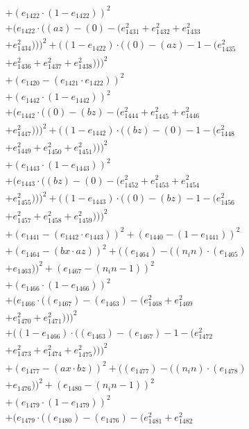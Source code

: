 \documentclass[10pt, a4paper]{article}
\begin{document}
\begin{align*}
& + (e_{1422}  \cdot  (1 - e_{1422}))^{2} \\
& + (e_{1422}  \cdot  ((az) - (0) - (e_{1431}^{2} + e_{1432}^{2} + e_{1433}^{2} \\
& + e_{1434}^{2})))^{2} + ((1 - e_{1422})  \cdot  ((0) - (az) - 1 - (e_{1435}^{2} \\
& + e_{1436}^{2} + e_{1437}^{2} + e_{1438}^{2})))^{2} \\
& + (e_{1420} - (e_{1421}  \cdot  e_{1422}))^{2} \\
& + (e_{1442}  \cdot  (1 - e_{1442}))^{2} \\
& + (e_{1442}  \cdot  ((0) - (bz) - (e_{1444}^{2} + e_{1445}^{2} + e_{1446}^{2} \\
& + e_{1447}^{2})))^{2} + ((1 - e_{1442})  \cdot  ((bz) - (0) - 1 - (e_{1448}^{2} \\
& + e_{1449}^{2} + e_{1450}^{2} + e_{1451}^{2})))^{2} \\
& + (e_{1443}  \cdot  (1 - e_{1443}))^{2} \\
& + (e_{1443}  \cdot  ((bz) - (0) - (e_{1452}^{2} + e_{1453}^{2} + e_{1454}^{2} \\
& + e_{1455}^{2})))^{2} + ((1 - e_{1443})  \cdot  ((0) - (bz) - 1 - (e_{1456}^{2} \\
& + e_{1457}^{2} + e_{1458}^{2} + e_{1459}^{2})))^{2} \\
& + (e_{1441} - (e_{1442}  \cdot  e_{1443}))^{2} + (e_{1440} - (1 - e_{1441}))^{2} \\
& + (e_{1464} - (bx  \cdot  az))^{2} + ((e_{1464}) - ((n_in)  \cdot  (e_{1465}) \\
& + e_{1463}))^{2} + (e_{1467} - (n_in - 1))^{2} \\
& + (e_{1466}  \cdot  (1 - e_{1466}))^{2} \\
& + (e_{1466}  \cdot  ((e_{1467}) - (e_{1463}) - (e_{1468}^{2} + e_{1469}^{2} \\
& + e_{1470}^{2} + e_{1471}^{2})))^{2} \\
& + ((1 - e_{1466})  \cdot  ((e_{1463}) - (e_{1467}) - 1 - (e_{1472}^{2} \\
& + e_{1473}^{2} + e_{1474}^{2} + e_{1475}^{2})))^{2} \\
& + (e_{1477} - (ax  \cdot  bz))^{2} + ((e_{1477}) - ((n_in)  \cdot  (e_{1478}) \\
& + e_{1476}))^{2} + (e_{1480} - (n_in - 1))^{2} \\
& + (e_{1479}  \cdot  (1 - e_{1479}))^{2} \\
& + (e_{1479}  \cdot  ((e_{1480}) - (e_{1476}) - (e_{1481}^{2} + e_{1482}^{2} \\

\end{align*}
\end{document}
